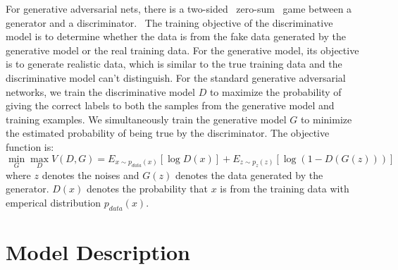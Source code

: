 \documentclass{llncs}
\begin{document}
For generative adversarial nets, there is a two-sided  zero-sum  game between a generator and a discriminator.  The training objective of the discriminative model is to determine whether the data is from the fake data generated by the generative model or the real training data. For the generative model, its objective is to generate realistic data, which is similar to the true training data and the discriminative model can't distinguish. For the standard generative adversarial networks, we train the discriminative model $D$ to maximize the probability of giving the correct labels to both the samples from the generative model and training examples. We simultaneously train the generative model $G$ to minimize the estimated probability of being true by the discriminator. The objective function is:
\begin{equation}
\min_G \max_D V(D,G) = E_{x\sim p_{data}(x)}[\log D(x)] + E_{z\sim p_z(z)}[\log(1-D(G(z)))]
\label{eq:pathnode}
\end{equation}
where $z$ denotes the noises and $G(z)$ denotes the data generated by the generator.  $D(x)$ denotes the probability that  $x$ is from the training data with emperical distribution $p_{data}(x)$.


\section{Model Description}
\end{document}
